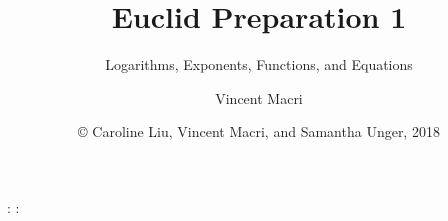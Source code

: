 

\usepackage{cleveref}

\title{Euclid Preparation 1}
\subtitle{Logarithms, Exponents, Functions, and Equations}
\author{Vincent Macri}
\date{\copyright{} Caroline Liu, Vincent Macri, and Samantha Unger, 2018}

\renewcommand\thepart{\Roman{part}}


	\frame{\titlepage}
	\begin{frame}
		: \tableofcontents[part=1]
		: \tableofcontents[part=2]
	\end{frame}
	
	

